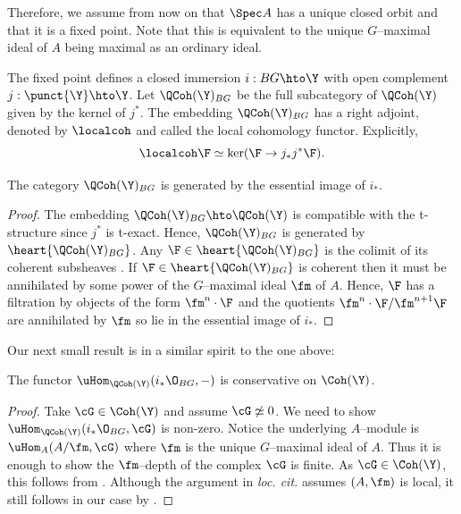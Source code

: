 \documentclass{amsart}
\begin{document}
  Therefore, we assume from now on that \(\Spec A\)
  has a unique closed orbit and that it is a fixed point.
  Note that this is equivalent to the unique
  \(G\)--maximal ideal of \(A\) being 
  maximal as an ordinary ideal.

  \sssec{}

  The fixed point defines a closed immersion \(i: BG \hto \Y\)
  with open complement \(j: \punct{\Y} \hto \Y\). Let \(\QCoh(\Y)_{BG}\)
  be the full subcategory of \(\QCoh(\Y)\) given by the
  kernel of \(j^\ast\). The embedding \(\QCoh(\Y)_{BG}\)
  has a right adjoint, denoted by \(\localcoh\)
  and called the local cohomology functor.
  Explicitly,
  \begin{displaymath}
    \localcoh \F \simeq \ker(\F \to j_\ast j^\ast \F).
  \end{displaymath}

  \begin{prop}\label{prop:bg_gens}
    The category \(\QCoh(\Y)_{BG}\) is generated by the essential image of \(i_\ast\).
  \end{prop}
  \begin{proof}
    The embedding \(\QCoh(\Y)_{BG} \hto \QCoh(\Y)\) is compatible
    with the t-structure since \(j^\ast\) is t-exact. Hence,
    \(\QCoh(\Y)_{BG}\) is generated by \(\heart{\QCoh(\Y)_{BG}}\).
    Any \(\F \in \heart{\QCoh(\Y)_{BG}}\) is the colimit
    of its coherent subsheaves \cite[Proposition 15.4]{laumon_moret_bailly:2005}.
    If \(\F \in \heart{\QCoh(\Y)_{BG}}\) is coherent
    then it must be annihilated by some power
    of the \(G\)--maximal ideal \(\fm\) of \(A\).
    Hence, \(\F\) has a filtration by objects
    of the form \(\fm^n \cdot \F\) and the
    quotients \(\fm^n \cdot \F / \fm^{n+1} \F\) are
    annihilated by \(\fm\) so lie in the essential
    image of \(i_\ast\).
  \end{proof}
  
  \sssec{}

  Our next small result is in a similar spirit to the one above:

  \begin{prop}\label{prop:k_generates}
    The functor \(\uHom_{\QCoh(\Y)}(i_\ast \O_{BG}, -)\) is conservative
    on \(\Coh(\Y)\).
  \end{prop}
  \begin{proof}
    Take \(\cG \in \Coh(\Y)\) and assume \(\cG \not\simeq 0\). We need to show
    \(\uHom_{\QCoh(\Y)}(i_\ast \O_{BG}, \cG)\)
    is non-zero. Notice the underlying \(A\)--module is
    \(\uHom_{A}(A/\fm, \cG)\) where \(\fm\) is the
    unique \(G\)--maximal ideal of \(A\).
    Thus it is enough to show the \(\fm\)--depth
    of the complex \(\cG\) is finite. As
    \(\cG \in \Coh(\Y)\), this follows from
    \cite[2.5]{foxby_iyengar:2003}.
    Although the argument in \emph{loc. cit.}
    assumes \((A, \fm)\) is local,
    it still follows in our case by
    .
  \end{proof}
\end{document}
